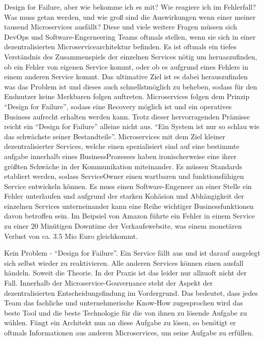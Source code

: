 Design for Failure, aber wie bekomme ich es mit? Wie reagiere ich im Fehlerfall? Was muss getan werden, und wie groß sind die Auswirkungen wenn einer meiner tausend Microservices ausfällt? Diese und viele weitere Fragen müssen sich DevOps und Software-Engerneering Teams oftmals stellen, wenn sie sich in einer dezentralisierten Microservicearchitektur befinden. Es ist oftmals ein tiefes Verständnis des Zusammenspiels der einzelnen Services nötig um heruaszufinden, ob ein Fehler von eigenen Service kommt, oder ob es aufgrund eines Fehlers in einem anderen Service kommt. Das ultimative Ziel ist es dabei herauszufinden was das Problem ist und dieses auch schnellstmöglich zu beheben, sodass für den Endnutzer keine Merkbaren folgen auftreten. Microservices folgen dem Prinzip \enquote{Design for Failure}, sodass eine Recovery möglich ist und ein operatives Business aufrecht erhalten werden kann. Trotz dieser hervorragenden Prämisse reicht ein \enquote{Design for Failure} alleine nicht aus. \enquote{Ein System ist nur so schlau wie das schwächste seiner Bestandteile}. Microservices mit dem Ziel kleiner dezentralisierter Services, welche einen spezialisiert sind auf eine bestimmte aufgabe innerhalb eines BusinessProzesses haben ironischerweise eine ihrer größten Schwäche in der Kommunikation miteinander. Es müssen Standards etabliert werden, sodass ServiceOwner einen wartbaren und funktionsfähigen Service entwickeln können. Es muss einen Software-Engeneer an einer Stelle ein Fehler unterlaufen und aufgrund der starken Kohäsion und Abhängigkeit der einzelnen Services unterneinander kann eine Reihe wichtiger Businessfunktionen davon betroffen sein. Im Beipsiel von Amazon führte ein Fehler in einem Service zu einer 20 Minütigen Downtime der Verkaufswebsite, was einem monetären Verlust von ca. 3.5 Mio Euro gleichkommt.

Kein Problem - \enquote{Design for Failure}. Ein Service fällt aus und ist darauf ausgelegt sich selbst wieder zu reaktivieren. Alle anderen Services können einen ausfall händeln. Soweit die Theorie. In der Praxis ist das leider nur allzuoft nicht der Fall. Innerhalb der Microservice-Gouvernance steht der Aspekt der dezentralisierten Entscheidungsfindung im Vordergrund. Das bedeutet, dass jedes Team das fachliche und unternehmerische Know-How zugesprochen wird das beste Tool und die beste Technologie für die von ihnen zu lösende Aufgabe zu wählen. Fängt ein Architekt nun an diese Aufgabe zu lösen, so benötigt er oftmals Informationen aus anderen Microservices, um seine Aufgabe zu erfüllen. 


